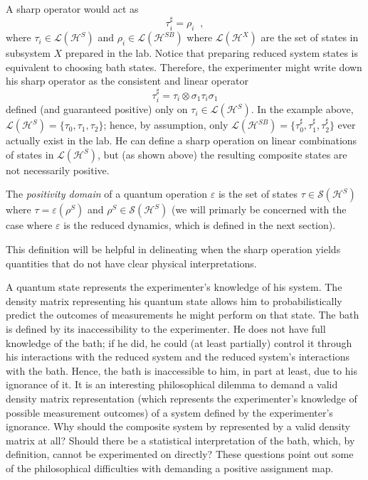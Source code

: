 A sharp operator would act as
$$
\tau_i^\sharp = \rho_i\;\;,
$$
where $\tau_i\in\mathcal{L}(\mathcal{H}^S)$ and $\rho_i\in\mathcal{L}(\mathcal{H}^{SB})$ where $\mathcal{L}(\mathcal{H}^X)$ are the set of states in subsystem $X$ prepared in the lab.  Notice that preparing reduced system states is equivalent to choosing bath states.  Therefore, the experimenter might write down his sharp operator as the consistent and linear operator
$$
\tau_i^\sharp = \tau_i \otimes \sigma_1\tau_i\sigma_1
$$
defined (and guaranteed positive) only on $\tau_i\in\mathcal{L}(\mathcal{H}^S)$.  In the example above, $\mathcal{L}(\mathcal{H}^S) = \{\tau_0,\tau_1,\tau_2\}$; hence, by assumption, only $\mathcal{L}(\mathcal{H}^{SB}) = \{\tau_0^\sharp,\tau_1^\sharp,\tau_2^\sharp\}$ ever actually exist in the lab.  He can define a sharp operation on linear combinations of states in $\mathcal{L}(\mathcal{H}^S)$, but (as shown above) the resulting composite states are not necessarily positive. 
\begin{definition}
The {\em positivity domain} of a quantum operation $\varepsilon$ is the set of states $\tau\in\mathcal{S}(\mathcal{H}^S)$ where $\tau=\varepsilon(\rho^S)$ and $\rho^S \in\mathcal{S}(\mathcal{H}^S)$ (we will primarly be concerned with the case where  $\varepsilon$ is the reduced dynamics, which is defined in the next section).
\end{definition} 

This definition will be helpful in delineating when the sharp operation yields quantities that do not have clear physical interpretations. 

A quantum state represents the experimenter's knowledge of his system.  The density matrix representing his quantum state allows him to probabilistically predict the outcomes of measurements he might perform on that state.  The bath is defined by its inaccessibility to the experimenter.  He does not have full knowledge of the bath; if he did, he could (at least partially) control it through his interactions with the reduced system and the reduced system's interactions with the bath.  Hence, the bath is inaccessible to him, in part at least, due to his ignorance of it.  It is an interesting philosophical dilemma to demand a valid density matrix representation (which represents the experimenter's knowledge of possible measurement outcomes) of a system defined by the experimenter's ignorance.  Why should the composite system by represented by a valid density matrix at all?  Should there be a statistical interpretation of the bath, which, by definition, cannot be experimented on directly?  These questions point out some of the philosophical difficulties with demanding a positive assignment map.

